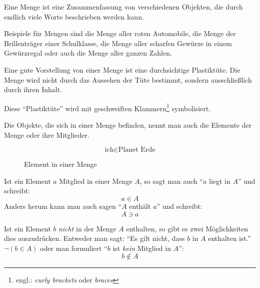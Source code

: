 \begin{defi}[Menge]
 Eine Menge ist eine Zusammenfassung von verschiedenen Objekten, die durch endlich viele Worte beschrieben werden kann.

Beispiele für Mengen sind die Menge aller roten Automobile, die Menge der Brillenträger einer Schulklasse, die Menge aller scharfen Gewürze in einem Gewürzregal oder auch die Menge aller ganzen Zahlen.

Eine gute Vorstellung von einer Menge ist eine durchsichtige Plastiktüte. Die Menge wird nicht durch das Aussehen der Tüte bestimmt, sondern ausschließlich durch ihren Inhalt.

Diese "`Plastiktüte"' wird mit geschweiften Klammern\footnote{engl.: \emph{curly brackets} oder \emph{braces}} symbolisiert.
\end{defi}

\begin{defi}[Element]
 Die Objekte, die sich in einer Menge befinden, nennt man auch die Elemente der Menge oder ihre Mitglieder.
 \begin{figure}
 \begin{center}
  \begin{equation*}
   \text{ich} \in \text{Planet Erde}
  \end{equation*}
 \end{center} 
  \caption{Element in einer Menge}
 \end{figure}
 
 Ist ein Element \(a\) Mitglied in einer Menge \(A\), so sagt man auch "`\(a\) liegt in \(A\)"' und schreibt: 
 \begin{equation*}
  a \in A
 \end{equation*}
 Anders herum kann man auch sagen "`\(A\) enthält \(a\)"' und schreibt: 
 \begin{equation*}
  A \ni a
 \end{equation*}
 
 Ist ein Element \(b\) \emph{nicht} in der Menge \(A\) enthalten, so gibt es zwei Möglichkeiten dies auszudrücken. Entweder man sagt: "`Es gilt nicht, dass \(b\) in \(A\) enthalten ist."' \(\lnot(b\in A)\) oder man formuliert "`\(b\) ist \emph{kein} Mitglied in \(A\)"':
 \begin{equation*}
  b \not\in A
 \end{equation*}
\end{defi}

